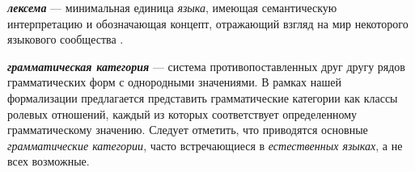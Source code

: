 \textit{\textbf{лексема}} --- минимальная единица \textit{языка}, имеющая семантическую интерпретацию и обозначающая концепт, отражающий взгляд на мир некоторого языкового сообщества .

\textit{\textbf{грамматическая категория}} --- система противопоставленных друг другу рядов грамматических форм с однородными значениями.
В рамках нашей формализации предлагается представить грамматические категории как классы ролевых отношений, каждый из которых соответствует определенному грамматическому значению.
Следует отметить, что приводятся основные \textit{грамматические категории}, часто встречающиеся в \textit{естественных языках}, а не всех возможные.

\begin{SCn}

    \begin{scnindent}
    \end{scnindent}
    \begin{scnindent}
    \end{scnindent}
    \begin{scnindent}
    \end{scnindent}
    \begin{scnindent}

\end{scnindent}
\end{SCn}
